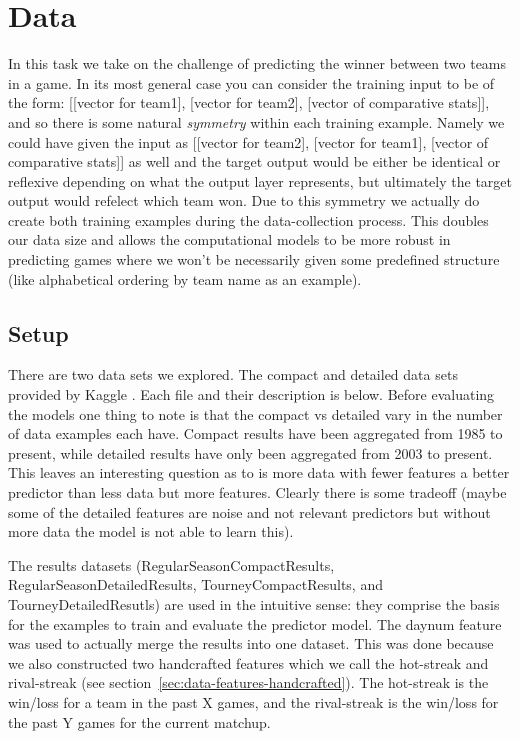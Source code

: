 \documentclass{article} %
\begin{document}
\section{Data}
\label{sec:data}

In this task we take on the challenge of predicting the winner between two teams in a game.
In its most general case you can consider the training input to be of the form: [[vector for team1], [vector for team2], [vector of comparative stats]], and so there is some natural \textit{symmetry} within each training example.
Namely we could have given the input as [[vector for team2], [vector for team1], [vector of comparative stats]] as well and the target output would be either be identical or reflexive depending on what the output layer represents, but ultimately the target output would refelect which team won.
Due to this symmetry we actually do create both training examples during the data-collection process.
This doubles our data size and allows the computational models to be more robust in predicting games where we won't be necessarily given some predefined structure (like alphabetical ordering by team name as an example).

\subsection{Setup}
\label{sec:data-setup}

There are two data sets we explored.
The compact and detailed data sets provided by Kaggle \citep{kagglecompetition}.
Each file and their description is below.
Before evaluating the models one thing to note is that the compact vs detailed vary in the number of data examples each have.
Compact results have been aggregated from 1985 to present, while detailed results have only been aggregated from 2003 to present.
This leaves an interesting question as to is more data with fewer features a better predictor than less data but more features.
Clearly there is some tradeoff (maybe some of the detailed features are noise and not relevant predictors but without more data the model is not able to learn this).

The results datasets (RegularSeasonCompactResults, RegularSeasonDetailedResults, TourneyCompactResults, and TourneyDetailedResutls) are used in the intuitive sense: they comprise the basis for the examples to train and evaluate the predictor model.
The daynum feature was used to actually merge the results into one dataset.
This was done because we also constructed two handcrafted features which we call the hot-streak and rival-streak (see section~\ref{sec:data-features-handcrafted}).
The hot-streak is the win/loss for a team in the past X games, and the rival-streak is the win/loss for the past Y games for the current matchup.
\end{document}
